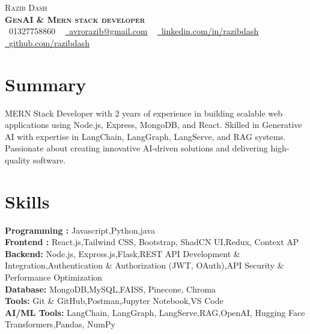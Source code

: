 \documentclass[letterpaper,11pt]{article}
\begin{document}
\begin{center}
    {\Huge \scshape Razib Dash} \\ \vspace{4pt}
    \textbf{\Large \scshape GenAI  \&  Mern stack developer} \\ \vspace{4pt}
    \small \faPhone\ 01327758860 ~ 
    \href{mailto:avrorazib@gmail.com}{\faEnvelope\ \underline{avrorazib@gmail.com}} ~ 
    \href{https://www.linkedin.com/in/razibdash/}{\faLinkedin\ \underline{linkedin.com/in/razibdash}} 
    \href{https://github.com/razibdash/}{\faGithub\ \underline{github.com/razibdash}} 
\end{center}

\section{Summary}
MERN Stack Developer with 2 years of experience in building scalable web applications using Node.js, Express, MongoDB, and React. Skilled in Generative AI with expertise in LangChain, LangGraph, LangServe, and RAG systems. Passionate about creating innovative AI-driven solutions and delivering high-quality software.

\section{Skills}
\textbf{Programming :} Javascript,Python,java \\
\textbf{Frontend :} React.js,Tailwind CSS, Bootstrap, ShadCN UI,Redux, Context AP \\
\textbf{Backend:} Node.js, Express.js,Flask,REST API Development \& Integration,Authentication & Authorization (JWT, OAuth),API Security \& Performance Optimization \\
\textbf{Database:} MongoDB,MySQL,FAISS, Pinecone, Chroma\\
\textbf{Tools:} Git \& GitHub,Postman,Jupyter Notebook,VS Code \\
\textbf{AI/ML Tools:} LangChain, LangGraph, LangServe,RAG,OpenAI, Hugging Face Transformers,Pandas, NumPy\\
\end{document}

